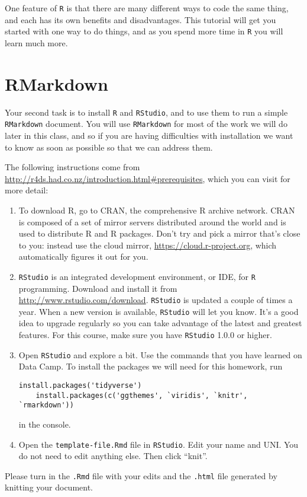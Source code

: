 \documentclass[paper=letter, fontsize=11pt]{scrartcl}
\numberwithin{equation}{section}
\numberwithin{figure}{section}
\numberwithin{table}{section}
\begin{document}
One feature of \texttt{R} is that there are many different ways to code the same thing, and each has its own benefits and disadvantages.
This tutorial will get you started with one way to do things, and as you spend more time in \texttt{R} you will learn much more.

\section{RMarkdown}

Your second task is to install \texttt{R} and \texttt{RStudio}, and to use them to run a simple \texttt{RMarkdown} document.
You will use \texttt{RMarkdown} for most of the work we will do later in this class, and so if you are having difficulties with installation we want to know as soon as possible so that we can address them.

The following instructions come from \url{http://r4ds.had.co.nz/introduction.html#prerequisites}, which you can visit for more detail:
\begin{enumerate}
  \item To download R, go to CRAN, the comprehensive R archive network.
  CRAN is composed of a set of mirror servers distributed around the world and is used to distribute R and R packages.
  Don’t try and pick a mirror that’s close to you: instead use the cloud mirror, \url{https://cloud.r-project.org}, which automatically figures it out for you.
  \item \texttt{RStudio} is an integrated development environment, or IDE, for \texttt{R} programming.
  Download and install it from \url{http://www.rstudio.com/download}.
  \texttt{RStudio} is updated a couple of times a year.
  When a new version is available, \texttt{RStudio} will let you know.
  It’s a good idea to upgrade regularly so you can take advantage of the latest and greatest features.
  For this course, make sure you have \texttt{RStudio} 1.0.0 or higher.
  \item Open \texttt{RStudio} and explore a bit. Use the commands that you have learned on Data Camp.
  To install the packages we will need for this homework, run
  \begin{lstlisting}[frame=single,basicstyle=\footnotesize]
    install.packages('tidyverse')
    install.packages(c('ggthemes', `viridis', `knitr', `rmarkdown'))
  \end{lstlisting}
  in the console.
  \item Open the \texttt{template-file.Rmd} file in \texttt{RStudio}.
  Edit your name and UNI.
  You do not need to edit anything else.
  Then click ``knit''.
\end{enumerate}
Please turn in the \texttt{.Rmd} file with your edits and the \texttt{.html} file generated by knitting your document.
\end{document}
